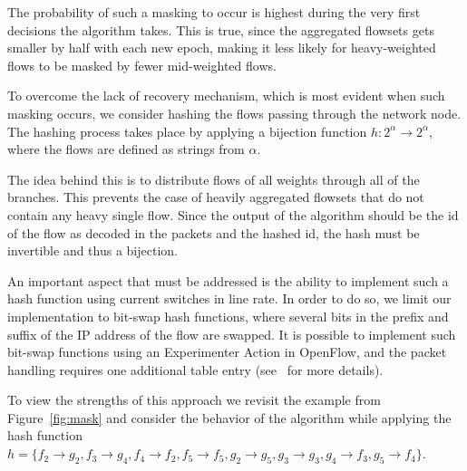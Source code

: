 The probability of such a masking to occur is highest during the very first decisions the algorithm takes. This is true, since the aggregated flowsets gets smaller by half with each new epoch, making it less likely for heavy-weighted flows to be masked by fewer mid-weighted flows.

To overcome the lack of recovery mechanism, which is most evident when such masking occurs, we consider hashing the flows passing through the network node. The hashing process takes place by applying a bijection function $h:2^{\alpha} \rightarrow 2^{\alpha}$, where the flows are defined as strings from $\alpha$.

The idea behind this is to distribute flows of all weights through all of the branches. This prevents the case of heavily aggregated flowsets that do not contain any heavy single flow. Since the output of the algorithm should be the id of the flow as decoded in the packets and the hashed id, the hash must be invertible and thus a bijection.

An important aspect that must be addressed is the ability to implement such a hash function using current switches in line rate.  In order to do so, we limit our implementation to bit-swap hash functions, where several bits in the prefix and suffix of the IP address of the flow are swapped.  It is possible to implement such bit-swap functions using an Experimenter Action in OpenFlow, and the packet handling requires one additional table entry (see~\cite{OF1.5} for more details).

To view the strengths of this approach we revisit the example from Figure~\ref{fig:mask} and consider the behavior of the algorithm while applying the hash function $h = \{f_2\rightarrow g_2, f_3\rightarrow g_4, f_4\rightarrow f_2, f_5\rightarrow f_5, g_2\rightarrow g_5, g_3\rightarrow g_3, g_4\rightarrow f_3, g_5\rightarrow f_4\}$.

